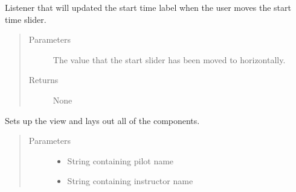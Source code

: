 \documentclass[letterpaper,10pt,english]{sphinxmanual}
\begin{document}
\begin{fulllineitems}

\begin{fulllineitems}
\label{\detokenize{index:src.Views.View_ReportScreen.ReportWindow.handleStartSliderValueChange}}
Listener that will updated the start time label when the user moves the start
time slider.
\begin{quote}\begin{description}
\item[{Parameters}] \leavevmode
{} \textendash{} The value that the start slider has been moved to horizontally.

\item[{Returns}] \leavevmode
None

\end{description}\end{quote}

\end{fulllineitems}


\begin{fulllineitems}
\label{\detokenize{index:src.Views.View_ReportScreen.ReportWindow.initView}}
Sets up the view and lays out all of the components.
\begin{quote}\begin{description}
\item[{Parameters}] \leavevmode\begin{itemize}
\item {} 
 \textendash{} String containing pilot name

\item {} 
 \textendash{} String containing instructor name


\end{itemize}
\end{description}
\end{quote}
\end{fulllineitems}
\end{fulllineitems}
\end{document}
